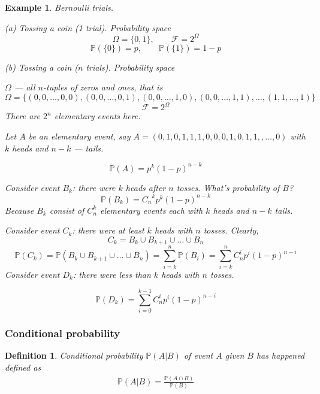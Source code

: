 \documentclass[10pt]{article}
\newtheorem*{definition}{Definition}
\newtheorem*{example}{Example}
\begin{document}
\begin{example} Bernoulli trials.

    (a) Tossing a coin (1 trial). Probability space
    $$
        \Omega=\{0, 1\},\qquad \mathcal{F}=2^{\Omega}
    $$
    $$
        \mathbb{P}(\{0\})=p,\qquad \mathbb{P}(\{1\})=1-p
    $$

    (b) Tossing a coin ($n$ trials). Probability space

    $\Omega$ --- all $n$-tuples of zeros and ones, that is
    $$
        \Omega=\{
        (0,0,\ldots,0,0),
        (0,0,\ldots,0,1),
        (0,0,\ldots,1,0),
        (0,0,\ldots,1,1),
        \ldots,
        (1,1,\ldots,1)
        \}
    $$
    $$
        \mathcal{F}=2^\Omega
    $$
    There are $2^n$ elementary events here.

    Let $A$ be an elementary event, say
    $A=(0,1,0,1,1,1,0,0,0,1,0,1,1,,\ldots,0)$ with $k$ heads and $n-k$ ---
    tails.

    $$
        \mathbb{P}(A)=p^k{(1-p)}^{n-k}
    $$

    Consider event $B_k$: there were $k$ heads after $n$ tosses. What's
    probability of $B$?
    $$
        \mathbb{P}(B_k)={C_n}^k p^k {(1-p)}^{n-k}
    $$
    Because $B_k$ consist of $C_n^k$ elementary events each with $k$ heads and
    $n-k$ tails.

    Consider event $C_k$: there were at least $k$ heads with $n$ tosses.
    Clearly,
    $$
        C_k=B_k\cup B_{k+1}\cup\ldots\cup B_n
    $$
    $$
        \mathbb{P}(C_k)
        =\mathbb{P}(B_k\cup B_{k+1}\cup\ldots\cup B_n)
        =\sum_{i=k}^n \mathbb{P}(B_i)
        =\sum_{i = k}^n C_n^i p^i {(1-p)}^{n-i}
    $$
    Consider event $D_k$: there were less than $k$ heads with $n$ tosses.

    $$
        \mathbb{P}(D_k)=\sum_{i=0}^{k-1} C_n^i p^i {(1-p)}^{n-i}
    $$

\end{example}

\subsubsection{Conditional probability}

\begin{definition} Conditional probability $\mathbb{P}(A|B)$ of event $A$ given
    $B$ has happened defined as
    \begin{align}
        \mathbb{P}(A|B)=\frac{\mathbb{P}(A\cap B)}{\mathbb{P}(B)}
    \end{align}
\end{definition}
\end{document}
